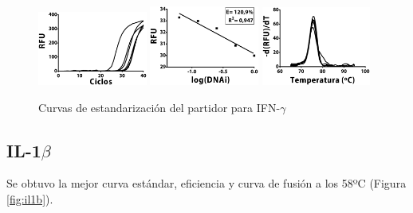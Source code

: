 \documentclass[12pt,letterpaper,oneside]{scrbook}
\begin{document}
\begin{figure}[h!]
\centering
        {\includegraphics[width=0.32\textwidth]{standarization/ifng/ampl}}
        {\includegraphics[width=0.32\textwidth]{standarization/ifng/stand}}
        {\includegraphics[width=0.32\textwidth]{standarization/ifng/melting}}
         \caption{Curvas de estandarización del partidor para IFN-$\gamma$}
         \label {fig:ifng}
    \end{figure}

\subsection{IL-1$\beta$}

Se obtuvo la mejor curva estándar, eficiencia y curva de fusión a los
58ºC (Figura \ref{fig:il1b}).
\end{document}

